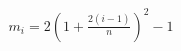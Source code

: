 \documentclass[preview]{standalone}
\begin{document}
\begin{align*}
m_i = 2\left(1 + \frac{2(i-1)}{n}\right)^2 - 1
\end{align*}
\end{document}
